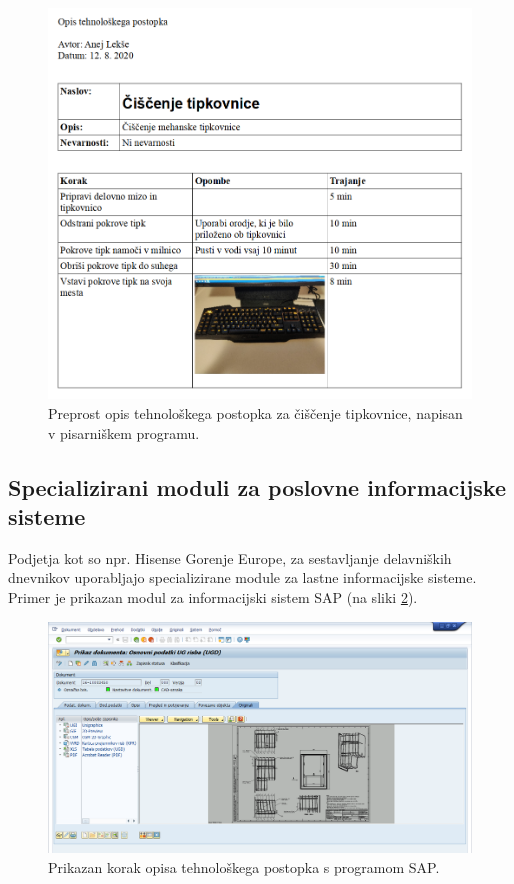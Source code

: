 \documentclass[a4paper, 12pt]{book}
\begin{document}
\begin{figure}[H]
\begin{center}
\includegraphics[width=13cm]{report_writer}
\end{center}
\caption{Preprost opis tehnološkega postopka za čiščenje tipkovnice, napisan v pisarniškem programu.}
\label{report_writer}
\end{figure}

\subsection{Specializirani moduli za poslovne informacijske sisteme}

Podjetja kot so npr. Hisense Gorenje Europe, za sestavljanje delavniških dnevnikov uporabljajo specializirane module za lastne informacijske sisteme.
Primer je prikazan modul za informacijski sistem SAP (na sliki \ref{sap_1}).

\begin{figure}[H]
\begin{center}
\includegraphics[width=13cm]{sap_1}
\end{center}
\caption{Prikazan korak opisa tehnološkega postopka s programom SAP.}
\label{sap_1}
\end{figure}
\end{document}
